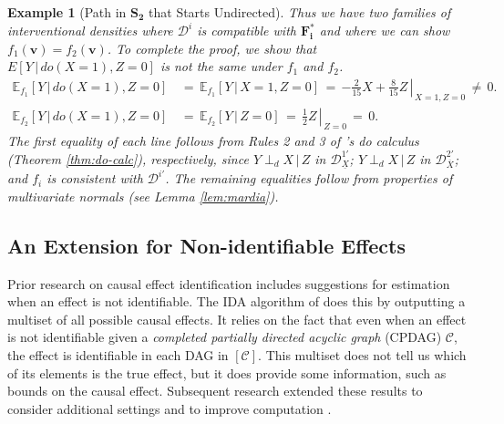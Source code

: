 \documentclass[11pt]{article}
\newtheorem{example}{Example}
\newcommand{\mb}[1]{\mathbf{#1}}
\newcommand{\dsepp}{\perp_{d}}
\newcommand{\g}[1][G]{\mathcal{#1}}
\newcommand{\E}{\mathbb{E}}
\begin{document}
\begin{example}[Path in $\mb{S_2}$ that Starts Undirected]
    Thus we have two families of interventional densities where $\g[D]^i$ is compatible with $\mb{F^*_i}$ and where we can show $f_1(\mb{v})=f_2(\mb{v})$. To complete the proof, we show that $E[Y \,|\, do(X=1), Z=0]$ is not the same under $f_1$ and $f_2$.
    \begin{align*}
        \E_{f_1}[Y \,|\, do(X=1), Z=0] 
            &\,=\,      \E_{f_1}[Y \,|\, X=1, Z=0] 
             \,=\,      \left. {-\tfrac{2}{15}X} + \tfrac{8}{15}Z \,\right\rvert_{\, X=1, Z=0} 
             \,\neq\,   0.\\
        \E_{f_2}[Y \,|\, do(X=1), Z=0]
            &\,=\,      \E_{f_2}[Y \,|\, Z=0]
             \,=\,      \left. {\tfrac{1}{2}Z} \,\right\rvert_{\, Z=0} 
             \,=\,      0.
    \end{align*}
    The first equality of each line follows from Rules 2 and 3 of \citeauthor{pearl2009causality}'s do calculus (Theorem \ref{thm:do-calc}), respectively, since $Y \dsepp X \,|\, Z$ in $\g[D]^{1'}_{\underline{X}}$; $Y \dsepp X \,|\, Z$ in $\g[D]^{2'}_{\overline{X}}$; and $f_i$ is consistent with $\g[D]^{i'}$. The remaining equalities follow from properties of multivariate normals (see Lemma \ref{lem:mardia}).
\end{example}











\subsection{An Extension for Non-identifiable Effects}
\label{sec:enumeration}

Prior research on causal effect identification includes suggestions for estimation when an effect is not identifiable. The IDA algorithm of \cite{maathuis2009estimating} does this by outputting a multiset of all possible causal effects. It relies on the fact that even when an effect is not identifiable given a \textit{completed partially directed acyclic graph} (CPDAG) $\g[C]$, the effect is identifiable in each DAG in $[\g[C]]$. This multiset does not tell us which of its elements is the true effect, but it does provide some information, such as bounds on the causal effect. Subsequent research extended these results to consider additional settings and to improve computation \citep{maathuis2010predicting, perkovic2017interpreting, nandy2017estimating, fang2020ida, guo2021minimal}.
\end{document}
